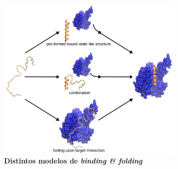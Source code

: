 \begin{figure}[h]
\centering
\includegraphics[width=0.8\textwidth]{img/PSE-MoRE.jpg} 
\caption{\textbf{Distintos modelos de \textit{binding \& folding}}} 
\label{idpBinding}
\end{figure}








% 








